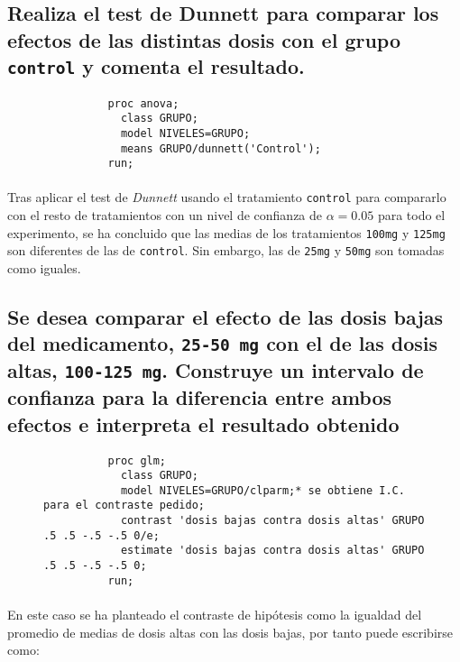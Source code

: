 \documentclass{article}
\begin{document}
    \subsection{Realiza el test de Dunnett para comparar los efectos de las distintas dosis con el grupo \texttt{control} y comenta el resultado.}

      \begin{figure}[h]
        \centering
        \begin{verbatim}
          proc anova;
            class GRUPO;
            model NIVELES=GRUPO;
            means GRUPO/dunnett('Control');
          run;
        \end{verbatim}
        \caption{}
        \label{code:sas_6}
      \end{figure}

      \paragraph{}
      Tras aplicar el test de \emph{Dunnett} usando el tratamiento \texttt{control} para compararlo con el resto de tratamientos con un nivel de confianza de $\alpha=0.05$ para todo el experimento, se ha concluido que las medias de los tratamientos \texttt{100mg} y \texttt{125mg} son diferentes de las de \texttt{control}. Sin embargo, las de \texttt{25mg} y \texttt{50mg} son tomadas como iguales.


    \subsection{Se desea comparar el efecto de las dosis bajas del medicamento, \texttt{25-50 mg} con el de las dosis altas, \texttt{100-125 mg}. Construye un intervalo de confianza para la diferencia entre ambos efectos e interpreta el resultado obtenido}

      \begin{figure}[h]
        \centering
        \begin{verbatim}
          proc glm;
            class GRUPO;
            model NIVELES=GRUPO/clparm;* se obtiene I.C. para el contraste pedido;
            contrast 'dosis bajas contra dosis altas' GRUPO .5 .5 -.5 -.5 0/e;
            estimate 'dosis bajas contra dosis altas' GRUPO .5 .5 -.5 -.5 0;
          run;
        \end{verbatim}
        \caption{}
        \label{code:sas_7}
      \end{figure}

      \paragraph{}
      En este caso se ha planteado el contraste de hipótesis como la igualdad del promedio de medias de dosis altas con las dosis bajas, por tanto puede escribirse como:
\end{document}
